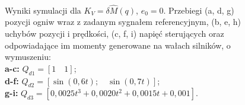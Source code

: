 \documentclass[10pt, a4paper, polish]{article}
\begin{document}
\begin{figure}[H]
\\[-2ex]
\caption{
	Wyniki symulacji dla $K_V=\delta\hat{M}(q)$, $e_0=0$. Przebiegi (a, d, g) pozycji ogniw wraz z zadanym sygnałem referencyjnym, (b, e, h) uchybów pozycji i prędkości, (c, f, i)  napięć sterujących oraz odpowiadające im momenty generowane na wałach silników, o wymuszeniu:\\
	\textbf{a-c:} $Q_{d1}=[1\quad1]$;\\
	\textbf{d-f:} $Q_{d2}=[\sin(0,6t);\quad \sin(0,7t)]$;\\
	\textbf{g-i:} $Q_{d3}=[0,0025t^3+0,0020t^2+0,0015t+0,001]$.}
\end{figure}
\end{document}
